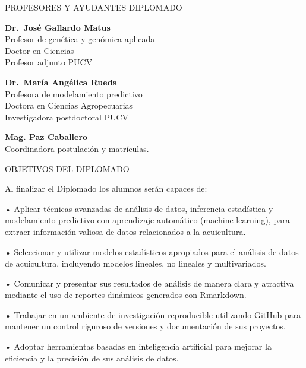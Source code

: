 \documentclass[
  ignorenonframetext,
]{beamer}
\begin{document}
\begin{frame}{PROFESORES Y AYUDANTES DIPLOMADO}
\protect\hypertarget{profesores-y-ayudantes-diplomado}{}

\textbf{Dr.~José Gallardo Matus}\\
Profesor de genética y genómica aplicada\\
Doctor en Ciencias\\
Profesor adjunto PUCV

\textbf{Dr.~María Angélica Rueda}\\
Profesora de modelamiento predictivo\\
Doctora en Ciencias Agropecuarias\\
Investigadora postdoctoral PUCV

\textbf{Mag. Paz Caballero}\\
Coordinadora postulación y matrículas.

\end{frame}

\begin{frame}{OBJETIVOS DEL DIPLOMADO}
\protect\hypertarget{objetivos-del-diplomado}{}

Al finalizar el Diplomado los alumnos serán capaces de:

• Aplicar técnicas avanzadas de análisis de datos, inferencia
estadística y modelamiento predictivo con aprendizaje automático
(machine learning), para extraer información valiosa de datos
relacionados a la acuicultura.

• Seleccionar y utilizar modelos estadísticos apropiados para el
análisis de datos de acuicultura, incluyendo modelos lineales, no
lineales y multivariados.

• Comunicar y presentar sus resultados de análisis de manera clara y
atractiva mediante el uso de reportes dinámicos generados con Rmarkdown.

• Trabajar en un ambiente de investigación reproducible utilizando
GitHub para mantener un control riguroso de versiones y documentación de
sus proyectos.

• Adoptar herramientas basadas en inteligencia artificial para mejorar
la eficiencia y la precisión de sus análisis de datos.

\end{frame}
\end{document}
